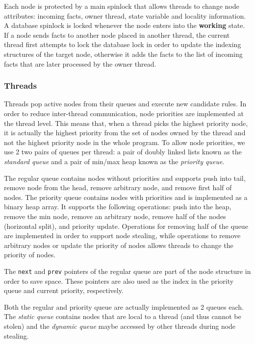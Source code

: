 Each node is protected by a main spinlock that allows threads to change node
attributes: incoming facts, owner thread, state variable and locality information.
A database spinlock is locked whenever the node enters into
the \textbf{working} state. If a node sends facts to another node placed in
another thread, the current thread first attempts to lock the database lock in order to update the
indexing structures of the target node, otherwise it adds the facts to the list of
incoming facts that are later processed by the owner thread.

\subsubsection{Threads}

Threads pop active nodes from their queues and execute new candidate rules. 
In order to reduce inter-thread communication, node priorities are implemented
at the thread level. This means that, when a thread picks the highest
priority node, it is actually the highest priority from the set of nodes owned
by the thread and not the highest priority node in the whole program.
To allow node priorities, we use 2 two pairs of queues per thread: a pair of doubly linked
lists known as the \emph{standard queue} and a pair of min/max heap known as the \emph{priority queue}.

The regular queue contains nodes without priorities and
supports push into tail, remove node from the head, remove arbitrary node, and
remove first half of nodes.
The priority queue contains nodes with priorities and is implemented as a binary
heap array. It supports the following operations: push into the heap, remove the min node,
remove an arbitrary node, remove half of the nodes (horizontal split), and
priority update.
Operations for removing half of the queue are implemented in order to support
node stealing, while operations to remove arbitrary nodes or update the
priority of nodes allows threads to change the priority of nodes.

The \texttt{next} and \texttt{prev} pointers of the regular queue are part of
the node structure in order to save space. These pointers are also used as the
index in the priority queue and current priority, respectively.

Both the regular and priority queue are actually implemented as 2 queues each.
The \emph{static queue} contains nodes that are local to a thread (and thus cannot be stolen) and
the \emph{dynamic queue} maybe accessed by other threads during node stealing.



